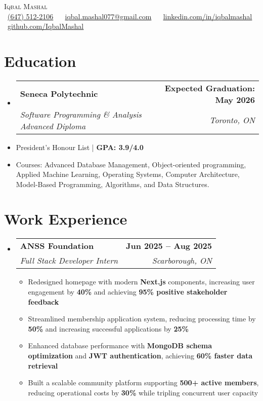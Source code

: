\documentclass[letterpaper,11pt]{article}
\makeatletter
\newcommand{\resumeItem}[1]{
  \item\small{
    {#1 \vspace{0pt}}
  }
}
\newcommand{\resumeSubheading}[4]{
  \vspace{-2pt}\item
    \begin{tabular*}{1.0\textwidth}[t]{l@{\extracolsep{\fill}}r}
      \textbf{#1} & \textbf{\small #2} \\
      \textit{\small#3} & \textit{\small #4} \\
    \end{tabular*}\vspace{-7pt}
}
\newcommand{\resumeSubHeadingListStart}{\begin{itemize}[leftmargin=0.0in, label={}]}
\newcommand{\resumeSubHeadingListEnd}{\end{itemize}}\vspace{0pt}
\newcommand{\resumeItemListStart}{\begin{itemize}}
\newcommand{\resumeItemListEnd}{\end{itemize}\vspace{-5pt}}
\makeatother
\begin{document}
\begin{center}
    {\Large \scshape Iqbal Mashal} \\[2mm]
    \footnotesize 
    \raisebox{-0.1\height}{\faPhone} \ \underline{(647) 512-2106} ~
    \raisebox{-0.1\height}{\faEnvelope} \ \underline{iqbal.mashal077@gmail.com} ~
    \raisebox{-0.1\height}{\faLinkedin} \ \underline{\href{https://www.linkedin.com/in/iqbalmashal/}{linkedin.com/in/iqbalmashal}} ~
    \raisebox{-0.1\height}{\faGithub} \ \underline{\href{https://github.com/IqbalMashal}{github.com/IqbalMashal}}
    \vspace{-8pt}
\end{center}

\section{Education}
\resumeSubHeadingListStart
    \resumeSubheading
        {Seneca Polytechnic}{Expected Graduation: May 2026}
        {Software Programming \& Analysis Advanced Diploma } {Toronto, ON}
\resumeSubHeadingListEnd

\resumeItemListStart
    \resumeItem{President’s Honour List | \textbf{GPA: 3.9/4.0}}
    \vspace{-7pt}
    \resumeItem{Courses: Advanced Database Management, Object-oriented programming, Applied Machine Learning, Operating Systems, Computer Architecture, Model-Based Programming, Algorithms, and Data Structures.}
\resumeItemListEnd
\vspace{-12pt}

\section{Work Experience}
\resumeSubHeadingListStart
    \resumeSubheading
        {ANSS Foundation}{Jun 2025 -- Aug 2025}
        {Full Stack Developer Intern}{Scarborough, ON}
        \resumeItemListStart
            \resumeItem{Redesigned homepage with modern \textbf{Next.js} components, increasing user engagement by \textbf{40\%} and achieving \textbf{95\% positive stakeholder feedback}}
            \resumeItem{Streamlined membership application system, reducing processing time by \textbf{50\%} and increasing successful applications by \textbf{25\%}}
            \resumeItem{Enhanced database performance with \textbf{MongoDB schema optimization} and \textbf{JWT authentication}, achieving \textbf{60\% faster data retrieval}}
            \resumeItem{Built a scalable community platform supporting \textbf{500+ active members}, reducing operational costs by \textbf{30\%} while tripling concurrent user capacity}
        \resumeItemListEnd
\resumeSubHeadingListEnd
\vspace{-12pt}
\end{document}
